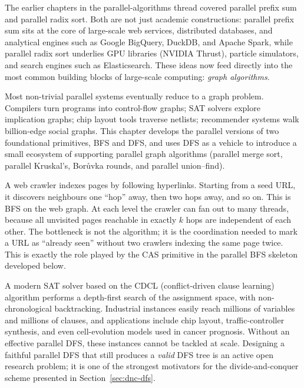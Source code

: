 The earlier chapters in the parallel-algorithms thread covered parallel
prefix sum and parallel radix sort.  Both are not just academic
constructions: parallel prefix sum sits at the core of large-scale web
services, distributed databases, and analytical engines such as Google
BigQuery, DuckDB, and Apache Spark, while parallel radix sort underlies
GPU libraries (NVIDIA Thrust), particle simulators, and search engines
such as Elasticsearch.  These ideas now feed directly into the most
common building blocks of large-scale computing: \emph{graph algorithms}.

Most non-trivial parallel systems eventually reduce to a graph problem.
Compilers turn programs into control-flow graphs; SAT solvers explore
implication graphs; chip layout tools traverse netlists; recommender
systems walk billion-edge social graphs.  This chapter develops the
parallel versions of two foundational primitives, BFS and DFS, and uses
DFS as a vehicle to introduce a small ecosystem of supporting parallel
graph algorithms (parallel merge sort, parallel Kruskal's, Bor\r{u}vka
rounds, and parallel union--find).

\begin{ppexample}
A web crawler indexes pages by following hyperlinks.  Starting from a
seed URL, it discovers neighbours one ``hop'' away, then two hops away,
and so on.  This is BFS on the web graph.  At each level the crawler can
fan out to many threads, because all unvisited pages reachable in
exactly $k$ hops are independent of each other.  The bottleneck is not
the algorithm; it is the coordination needed to mark a URL as
``already seen'' without two crawlers indexing the same page twice.
This is exactly the role played by the CAS primitive in the parallel
BFS skeleton developed below.
\end{ppexample}

\begin{ppexample}
A modern SAT solver based on the CDCL (conflict-driven clause learning)
algorithm performs a depth-first search of the assignment space, with
non-chronological backtracking.  Industrial instances easily reach
millions of variables and millions of clauses, and applications include
chip layout, traffic-controller synthesis, and even cell-evolution
models used in cancer prognosis.  Without an effective parallel DFS,
these instances cannot be tackled at scale.  Designing a faithful
parallel DFS that still produces a \emph{valid} DFS tree is an active
open research problem; it is one of the strongest motivators for the
divide-and-conquer scheme presented in
Section~\ref{sec:dnc-dfs}.
\end{ppexample}

